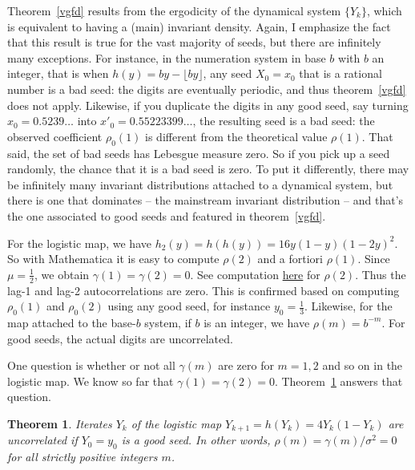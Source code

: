 \documentclass[oneside,10pt]{book}
\newtheorem{theorem}{Theorem}[section]
\begin{document}
Theorem~\ref{vgfd} results from the \textcolor{index}{ergodicity} of the dynamical system $\{Y_k\}$,
 which is equivalent to having a (main) invariant density. Again, I emphasize the fact that this result is true for the vast majority of seeds, but there are infinitely many exceptions. For instance,
 in the numeration system in base $b$ with $b$ an integer, that is when $h(y)=by - \lfloor by \rfloor$, any seed $X_0=x_0$ that is a rational number is a \textcolor{index}{bad seed}: the digits are eventually periodic, and thus theorem~\ref{vgfd} does not apply. Likewise, if you duplicate the digits in any good seed, say turning $x_0=0.5239\dots$ into $x'_0=0.55223399\dots$, the resulting seed is a bad seed: the observed coefficient
 $\rho_0(1)$ is different from the theoretical value $\rho(1)$. That said, the set of bad seeds has Lebesgue measure zero. So if you pick up a seed randomly, the chance that it is a bad seed is zero. To put it differently, there may be infinitely many invariant  distributions attached to a dynamical system, but there is one that dominates -- the mainstream invariant distribution -- and that's the one associated to good seeds
 and featured in theorem~\ref{vgfd}.

For the logistic map, we have $h_2(y)=h(h(y))=16 y(1-y)(1-2y)^2$. So with Mathematica it is easy to compute $\rho(2)$ and a fortiori $\rho(1)$. Since $\mu=\frac{1}{2}$, we obtain $\gamma(1)=\gamma(2)=0$.  See computation \href{https://mltblog.com/3EFVKQo}{here} for $\rho(2)$. Thus
the lag-1 and lag-2 autocorrelations are zero. This is confirmed based on computing $\rho_0(1)$ and $\rho_0(2)$ using any good seed, for instance $y_0=\frac{1}{3}$. Likewise, for the map attached to the base-$b$ system, if $b$ is an integer, we have
$\rho(m)=b^{-m}$. For good seeds, the actual digits are uncorrelated.

One question is whether or not all $\gamma(m)$ are zero for $m=1,2$ and so on in the logistic map. We know so far
 that $\gamma(1)=\gamma(2)=0$. Theorem~\ref{vgfd2} answers that question.

 \begin{theorem}\label{vgfd2}
Iterates $Y_k$ of the logistic map $Y_{k+1}=h(Y_k) = 4Y_k(1-Y_k)$ are uncorrelated if $Y_0=y_0$ is a good seed.
In other words, $\rho(m)=\gamma(m)/\sigma^2 = 0$ for all strictly positive integers $m$.
\end{theorem}
\end{document}
